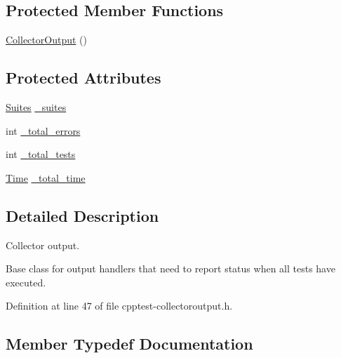 \subsection*{Protected Member Functions}
\begin{DoxyCompactItemize}
\item 
\mbox{\hyperlink{class_test_1_1_collector_output_a852bde8f194b4f81ca36f222257adc53}{Collector\+Output}} ()
\end{DoxyCompactItemize}
\subsection*{Protected Attributes}
\begin{DoxyCompactItemize}
\item 
\mbox{\hyperlink{class_test_1_1_collector_output_a0879ce3b51f1e3b3fe14aa5665dccd30}{Suites}} \mbox{\hyperlink{class_test_1_1_collector_output_a9f79c0fa5abf1d6248a85e7ae4701c5f}{\+\_\+suites}}
\item 
int \mbox{\hyperlink{class_test_1_1_collector_output_a7d8ec4ad0316b57aa96ae50a548c94d2}{\+\_\+total\+\_\+errors}}
\item 
int \mbox{\hyperlink{class_test_1_1_collector_output_ace6c1fc02a6ac7a6c15b982b96f5f68f}{\+\_\+total\+\_\+tests}}
\item 
\mbox{\hyperlink{class_test_1_1_time}{Time}} \mbox{\hyperlink{class_test_1_1_collector_output_af1e014fde4bf5b4e6c89de748630aa79}{\+\_\+total\+\_\+time}}
\end{DoxyCompactItemize}


\subsection{Detailed Description}
Collector output. 

Base class for output handlers that need to report status when all tests have executed. 

Definition at line 47 of file cpptest-\/collectoroutput.\+h.



\subsection{Member Typedef Documentation}
\mbox{\label{class_test_1_1_collector_output_a1921f35e0da596bd75da5824afe872c9}} 
